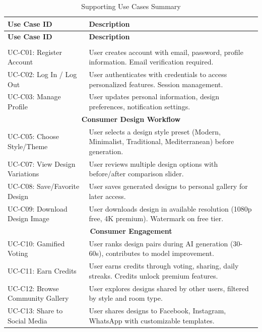 \begin{longtable}{p{3.5cm}p{10cm}}
\caption{Supporting Use Cases Summary} \label{tab:supporting_uc} \\
\toprule
\textbf{Use Case ID} & \textbf{Description} \\
\midrule
\endfirsthead
\toprule
\textbf{Use Case ID} & \textbf{Description} \\
\midrule
\endhead
\midrule
\endfoot
\bottomrule
\endlastfoot

\multicolumn{2}{c}{\textbf{Consumer Account \& Access}} \\
\midrule
UC-C01: Register Account & User creates account with email, password, profile information. Email verification required. \\
UC-C02: Log In / Log Out & User authenticates with credentials to access personalized features. Session management. \\
UC-C03: Manage Profile & User updates personal information, design preferences, notification settings. \\
\midrule

\multicolumn{2}{c}{\textbf{Consumer Design Workflow}} \\
\midrule
UC-C05: Choose Style/Theme & User selects a design style preset (Modern, Minimalist, Traditional, Mediterranean) before generation. \\
UC-C07: View Design Variations & User reviews multiple design options with before/after comparison slider. \\
UC-C08: Save/Favorite Design & User saves generated designs to personal gallery for later access. \\
UC-C09: Download Design Image & User downloads design in available resolution (1080p free, 4K premium). Watermark on free tier. \\
\midrule

\multicolumn{2}{c}{\textbf{Consumer Engagement}} \\
\midrule
UC-C10: Gamified Voting & User ranks design pairs during AI generation (30-60s), contributes to model improvement. \\
UC-C11: Earn Credits & User earns credits through voting, sharing, daily streaks. Credits unlock premium features. \\
UC-C12: Browse Community Gallery & User explores designs shared by other users, filtered by style and room type. \\
UC-C13: Share to Social Media & User shares designs to Facebook, Instagram, WhatsApp with customizable templates. \\
\midrule


\end{longtable}
